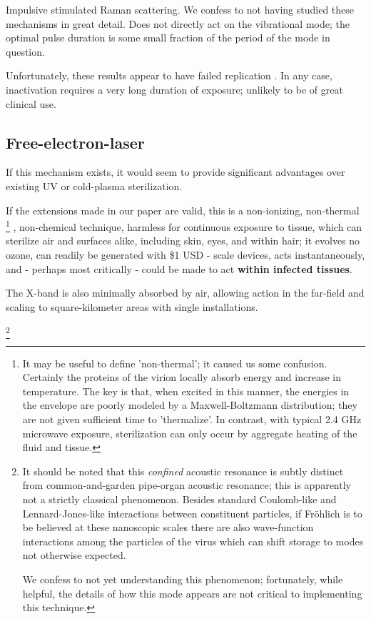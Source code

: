 \documentclass[paper.tex]{subfiles}
\begin{document}
Impulsive stimulated Raman scattering. We confess to not having studied these mechanisms in great detail. Does not directly act on 
the vibrational mode; the optimal pulse duration is some small fraction of the period of the mode in question.

Unfortunately, these results appear to have failed replication \cite{No2011}. In any case, inactivation requires a very long duration of exposure; unlikely to be of great clinical use.

\subsection{Free-electron-laser }


If this mechanism exists, it would seem to provide significant advantages over existing UV or cold-plasma sterilization. 

If the extensions made in our paper are valid, this is a non-ionizing, non-thermal
%
\footnote{It may be useful to define 'non-thermal'; it caused us some confusion. Certainly the proteins of the virion locally absorb energy and increase in temperature. The key is that, when excited in this manner, the energies in the envelope are poorly modeled by a Maxwell-Boltzmann distribution; they are not given sufficient time to 'thermalize'. In contrast, with typical 2.4 GHz microwave exposure, sterilization can only occur by aggregate heating of the fluid and tissue.} 
%
, non-chemical technique, harmless for continuous exposure to tissue, which can sterilize air and surfaces alike, including skin, eyes, and within hair; it evolves no ozone, can readily be generated with \$1 USD - scale devices, acts instantaneously, and - perhaps most critically - could be made to act {\bf within infected tissues}.

The X-band is also minimally absorbed by air, allowing action in the far-field and scaling to square-kilometer areas with single installations.






\footnote{It should be noted that this {\it confined} acoustic resonance is subtly distinct from common-and-garden pipe-organ acoustic resonance; this is apparently not a strictly classical phenomenon. Besides standard Coulomb-like and Lennard-Jones-like interactions between constituent particles, if Fr\"{o}hlich is to be believed at these nanoscopic scales there are also wave-function interactions among the particles of the virus which can shift storage to modes not otherwise expected.
	
	We confess to not yet understanding this phenomenon; fortunately, while helpful, the details of how this mode appears are not critical to implementing this technique.}
\end{document}
